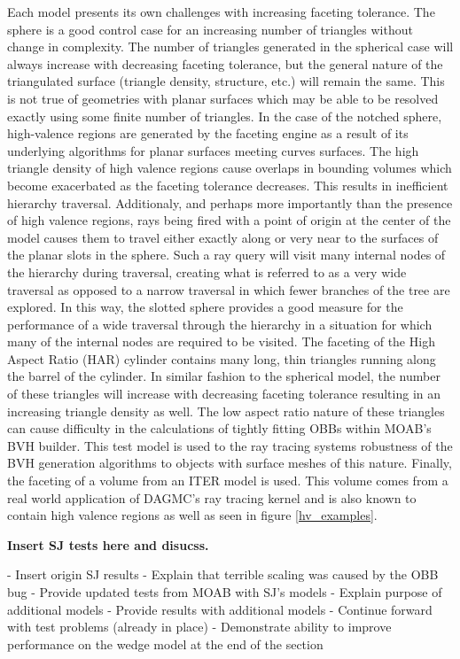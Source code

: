 \documentclass[12pt, a4paper]{article}
\begin{document}
Each model presents its own challenges with increasing faceting tolerance. The sphere is a good control case for an increasing number of triangles without change in complexity. The number of triangles generated in the spherical case will always increase with decreasing faceting tolerance, but the general nature of the triangulated surface (triangle density, structure, etc.) will remain the same. This is not true of geometries with planar surfaces which may be able to be resolved exactly using some finite number of triangles. In the case of the notched sphere, high-valence regions are generated by the faceting engine as a result of its underlying algorithms for planar surfaces meeting curves surfaces. The high triangle density of high valence regions cause overlaps in bounding volumes which become exacerbated as the faceting tolerance decreases. This results in inefficient hierarchy traversal. Additionaly, and perhaps more importantly than the presence of high valence regions, rays being fired with a point of origin at the center of the model causes them to travel either exactly along or very near to the surfaces of the planar slots in the sphere. Such a ray query will visit many internal nodes of the hierarchy during traversal, creating what is referred to as a very wide traversal as opposed to a narrow traversal in which fewer branches of the tree are explored. In this way, the slotted sphere provides a good measure for the performance of a wide traversal through the hierarchy in a situation for which many of the internal nodes are required to be visited. The faceting of the High Aspect Ratio (HAR) cylinder contains many long, thin triangles running along the barrel of the cylinder. In similar fashion to the spherical model, the number of these triangles will increase with decreasing faceting tolerance resulting in an increasing triangle density as well. The low aspect ratio nature of these triangles can cause difficulty in the calculations of tightly fitting OBBs within MOAB's BVH builder. This test model is used to the ray tracing systems robustness of the BVH generation algorithms to objects with surface meshes of this nature. Finally, the faceting of a volume from an ITER model is used. This volume comes from a real world application of DAGMC's ray tracing kernel and is also known to contain high valence regions as well as seen in figure \ref{hv_examples}.

\textbf{Insert SJ tests here and disucss.}

- Insert origin SJ results
- Explain that terrible scaling was caused by the OBB bug
- Provide updated tests from MOAB with SJ's models
- Explain purpose of additional models
- Provide results with additional models
- Continue forward with test problems (already in place)
- Demonstrate ability to improve performance on the wedge model at the end of the section
\end{document}

